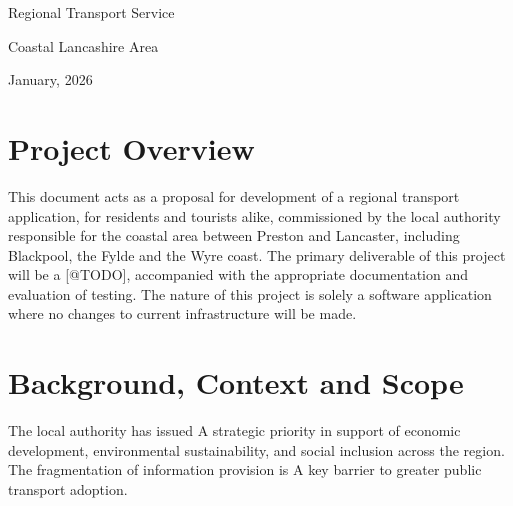 \documentclass{article}
\begin{document}
\begin{titlepage}

\begin{flushright}

\vspace{7.5cm}

\Huge{Regional Transport Service}

\vspace{0.5cm}

\large{Coastal Lancashire Area}

\vspace{8cm}

\normalsize{January, 2026}

\end{flushright}

\end{titlepage}
\newpage

\tableofcontents
\newpage

\section{Project Overview}
This document acts as a proposal for development of a regional transport application, for residents and tourists alike, commissioned by the local authority responsible for the coastal area between Preston and Lancaster, including Blackpool, the Fylde and the Wyre coast. The primary deliverable of this project will be a [@TODO], accompanied with the appropriate documentation and evaluation of testing. The nature of this project is solely a software application where no changes to current infrastructure will be made.
\newpage

\section{Background, Context and Scope}
The local authority has issued A strategic priority in support of economic development, environmental sustainability, and social inclusion across the region. The fragmentation of information provision is A key barrier to greater public transport adoption. \\
\end{document}
